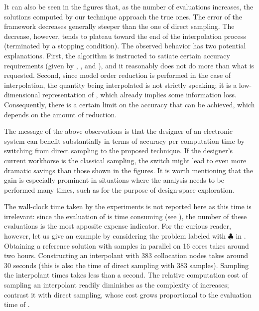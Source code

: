 It can also be seen in the figures that, as the number of evaluations increases,
the solutions computed by our technique approach the true ones. The error of the
framework decreases generally steeper than the one of direct sampling. The
decrease, however, tends to plateau toward the end of the interpolation process
(terminated by a stopping condition). The observed behavior has two potential
explanations. First, the algorithm is instructed to satiate certain accuracy
requirements (given by , , and ), and it reasonably
does not do more than what is requested. Second, since model order reduction is
performed in the case of interpolation, the quantity being interpolated is not
\g strictly speaking; it is a low-dimensional representation of \g, which
already implies some information loss. Consequently, there is a certain limit on
the accuracy that can be achieved, which depends on the amount of reduction.

The message of the above observations is that the designer of an electronic
system can benefit substantially in terms of accuracy per computation time by
switching from direct sampling to the proposed technique. If the designer's
current workhorse is the classical  sampling, the switch might lead to
even more dramatic savings than those shown in the figures. It is worth
mentioning that the gain is especially prominent in situations where the
analysis needs to be performed many times, such as for the purpose of
design-space exploration.

\begin{remark}
The wall-clock time taken by the experiments is not reported here as this time
is irrelevant: since the evaluation of \g is time consuming (see
), the number of these evaluations is the most apposite
expense indicator. For the curious reader, however, let us give an example by
considering the problem labeled with $\clubsuit$ in
. Obtaining a reference solution with
 samples in parallel on 16 cores takes around two hours.
Constructing an interpolant with 383 collocation nodes takes around 30 seconds
(this is also the time of direct sampling with 383 samples). Sampling the
interpolant  times takes less than a second. The relative
computation cost of sampling an interpolant readily diminishes as the complexity
of \g increases; contrast it with direct sampling, whose cost grows proportional
to the evaluation time of \g.
\end{remark}

